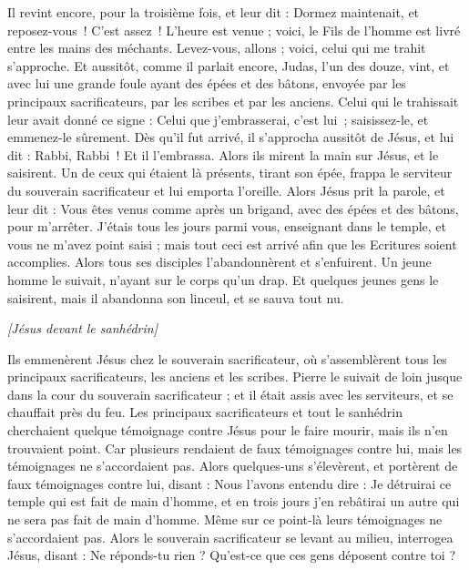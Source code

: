 \begin{multicols}{2}
Il revint encore, pour la troisième fois, et leur dit : Dormez maintenait, et reposez-vous ! C’est assez ! L’heure est venue ; voici, le Fils de l'homme est livré entre les mains des méchants.
Levez-vous, allons ; voici, celui qui me trahit s'approche.
Et aussitôt, comme il parlait encore, Judas, l'un des douze, vint, et avec lui une grande foule ayant des épées et des bâtons, envoyée par les principaux sacrificateurs, par les scribes et par les anciens.
Celui qui le trahissait leur avait donné ce signe : Celui que j'embrasserai, c’est lui ; saisissez-le, et emmenez-le sûrement.
Dès qu’il fut arrivé, il s'approcha aussitôt de Jésus, et lui dit : Rabbi, Rabbi ! Et il l’embrassa.
Alors ils mirent la main sur Jésus, et le saisirent.
Un de ceux qui étaient là présents, tirant son épée, frappa le serviteur du souverain sacrificateur et lui emporta l'oreille.
Alors Jésus prit la parole, et leur dit : Vous êtes venus comme après un brigand, avec des épées et des bâtons, pour m’arrêter.
J’étais tous les jours parmi vous, enseignant dans le temple, et vous ne m'avez point saisi ; mais tout ceci est arrivé afin que les Ecritures soient accomplies.
Alors tous ses disciples l'abandonnèrent et s'enfuirent.
Un jeune homme le suivait, n’ayant sur le corps qu’un drap. Et quelques jeunes gens le saisirent,
mais il abandonna son linceul, et se sauva tout nu.
\begin{center}
\textit{[Jésus devant le sanhédrin]}
\end{center}
\PPE{}
Ils emmenèrent Jésus chez le souverain sacrificateur, où s'assemblèrent tous les principaux sacrificateurs, les anciens et les scribes.
Pierre le suivait de loin jusque dans la cour du souverain sacrificateur ; et il était assis avec les serviteurs, et se chauffait près du feu.
Les principaux sacrificateurs et tout le sanhédrin cherchaient quelque témoignage contre Jésus pour le faire mourir, mais ils n'en trouvaient point.
Car plusieurs rendaient de faux témoignages contre lui, mais les témoignages ne s’accordaient pas.
Alors quelques-uns s'élevèrent, et portèrent de faux témoignages contre lui, disant :
Nous l’avons entendu dire : Je détruirai ce temple qui est fait de main d’homme, et en trois jours j'en rebâtirai un autre qui ne sera pas fait de main d’homme.
Même sur ce point-là leurs témoignages ne s’accordaient pas.
Alors le souverain sacrificateur se levant au milieu, interrogea Jésus, disant : Ne réponds-tu rien ? Qu’est-ce que ces gens déposent contre toi ?

\end{multicols}
